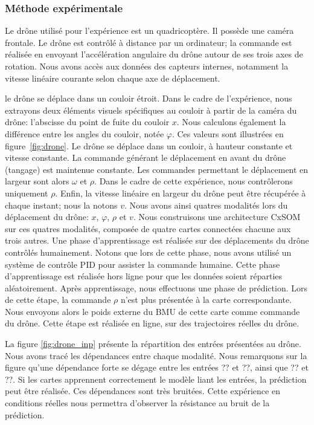 \documentclass[../main]{subfiles}
\begin{document}
\subsubsection{Méthode expérimentale}

Le drône utilisé pour l'expérience est un quadricoptère. Il possède une caméra frontale.
Le drône est contrôlé à distance par un ordinateur; la commande est réalisée en envoyant l'accélération angulaire du drône autour de ses trois axes de rotation.
Nous avons accès aux données des capteurs internes, notamment la vitesse linéaire courante selon chaque axe de déplacement.

le drône se déplace dans un couloir étroit.
Dans le cadre de l'expérience, nous extrayons deux éléments visuels spécifiques au couloir à partir de la caméra du drône: l'abscisse du point de fuite du couloir $x$. Nous calculons également la différence entre les angles du couloir, notée $\varphi$. Ces valeurs sont illustrées en figure~\ref{fig:drone}.
Le drône se déplace dans un couloir, à hauteur constante et vitesse constante.
La commande générant le déplacement en avant du drône (tangage) est maintenue constante. Les commandes permettant le déplacement en largeur sont alors $\omega$ et $\rho$. Dans le cadre de cette expérience, nous contrôlerons uniquement $\rho$.
Enfin, la vitesse linéaire en largeur du drône peut être récupérée à chaque instant; nous la notons $v$.
Nous avons ainsi quatres modalités lors du déplacement du drône: $x$, $\varphi$, $\rho$ et $v$.
Nous construisons une architecture CxSOM sur ces quatres modalités, composée de quatre cartes connectées chacune aux trois autres.
Une phase d'apprentissage est réalisée sur des déplacements du drône contrôlés humainement. Notons que lors de cette phase, nous avons utilisé un système de contrôle PID pour assister la commande humaine. Cette phase d'apprentissage est réalisée hors ligne pour que les données soient réparties aléatoirement.
Après apprentissage, nous effectuons une phase de prédiction. Lors de cette étape, la commande $\rho$ n'est plus présentée à la carte correspondante. Nous envoyons alors le poids externe du BMU de cette carte comme commande du drône. Cette étape est réalisée en ligne, sur des trajectoires réelles du drône.

La figure \ref{fig:drone_inp} présente la répartition des entrées présentées au drône. Nous avons tracé les dépendances entre chaque modalité. Nous remarquons sur la figure qu'une dépendance forte se dégage entre les entrées ?? et ??, ainsi que ?? et ??. Si les cartes apprennent correctement le modèle liant les entrées, la prédiction peut être réalisée.
Ces dépendances sont très bruitées. Cette expérience en conditions réelles nous permettra d'observer la résistance au bruit de la prédiction.
\end{document}
